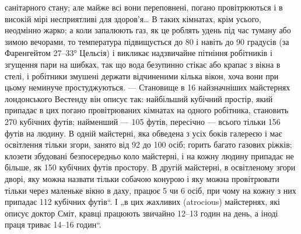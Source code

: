 \parcont{}  %
санітарного стану; але майже всі вони переповнені, погано провітрюються і в високій мірі
несприятливі для здоров’я\dots{} В таких
кімнатах, крім усього, неодмінно жарко; а коли запалюють газ,
як це роблять удень під час туману або зимою вечорами, то температура підвищується до 80 і навіть до
90 градусів (за Фаренгейтом \deq{} 27--33° Цельсія) і викликає надзвичайне пітніння робітників
і згущення пари на шибках, так що вода безупинно стікає або
крапає з вікна в стелі, і робітники змушені держати відчиненими
кілька вікон, хоча вони при цьому неминуче простуджуються. —
Становище в 16 найзначніших майстернях лондонського Вестенду
він описує так: найбільший кубічний простір, який припадає
в цих погано провітрюваних кімнатах на одного робітника, становить 270 кубічних футів; найменший —
105 футів, пересічно —
всього тільки 156 футів на людину. В одній майстерні, яка обведена з усіх боків галереєю і має
освітлення тільки згори,
занято від 92 до 100 осіб; горить багато газових ріжків; клозети
збудовані безпосередньо коло майстерні, і на кожну людину
припадає не більше, як 150 кубічних футів простору. В другій
майстерні, в освітленому згори дворі, яку можна назвати тільки
собачою конурою і яку можна провітрювати тільки через маленьке вікно в даху, працює 5 чи 6 осіб, при
чому на кожну
з них припадає 112 кубічних футів“. І „в цих жахливих (atrocious) майстернях, які описує доктор
Сміт, кравці працюють
звичайно 12--13 годин на день, а іноді праця триває 14--16 годин“.

